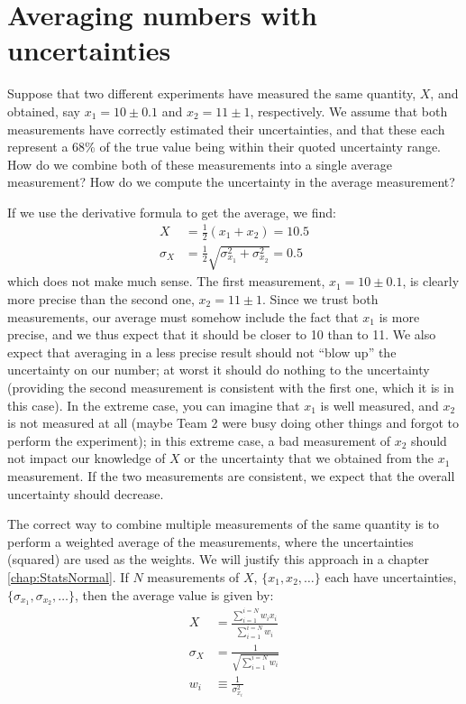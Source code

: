 \clearpage
\section{Averaging numbers with uncertainties}
Suppose that two different experiments have measured the same quantity, $X$, and obtained, say $x_1=10 \pm 0.1$ and $x_2=11 \pm 1$, respectively. We assume that both measurements have correctly estimated their uncertainties, and that these each represent a 68\% of the true value being within their quoted uncertainty range. How do we combine both of these measurements into a single average measurement? How do we compute the uncertainty in the average measurement?

If we use the derivative formula to get the average, we find:
\begin{align*}
X &= \frac{1}{2} (x_1+x_2)=10.5\\
\sigma_{X} &= \frac{1}{2}\sqrt{\sigma_{x_1}^2+\sigma_{x_2}^2}=0.5
\end{align*}
which does not make much sense. The first measurement, $x_1=10 \pm 0.1$, is clearly more precise than the second one, $x_2=11 \pm 1$. Since we trust both measurements, our average must somehow include the fact that $x_1$ is more precise, and we thus expect that it should be closer to 10 than to 11. We also expect that averaging in a less precise result should not ``blow up'' the uncertainty on our number; at worst it should do nothing to the uncertainty (providing the second measurement is consistent with the first one, which it is in this case). In the extreme case, you can imagine that $x_1$ is well measured, and $x_2$ is not measured at all (maybe Team 2 were busy doing other things and forgot to perform the experiment); in this extreme case, a bad measurement of $x_2$ should not impact our knowledge of $X$ or the uncertainty that we obtained from the $x_1$ measurement. If the two measurements are consistent, we expect that the overall uncertainty should decrease. 

The correct way to combine multiple measurements of the same quantity is to perform a weighted average of the measurements, where the uncertainties (squared) are used as the weights. We will justify this approach in a chapter \ref{chap:StatsNormal}. If $N$ measurements of $X$, $\{x_1, x_2 ,\dots\}$ each have uncertainties, $\{\sigma_{x_1}, \sigma_{x_2} ,\dots\}$, then the average value is given by:
\begin{align*}
X &= \frac{\sum_{i=1}^{i=N}w_ix_i}{\sum_{i=1}^{i=N}w_i}\\
\sigma_{X} &= \frac{1}{\sqrt{\sum_{i=1}^{i=N}w_i}}\\
w_i&\equiv\frac{1}{\sigma_{x_i}^2}
\end{align*}

